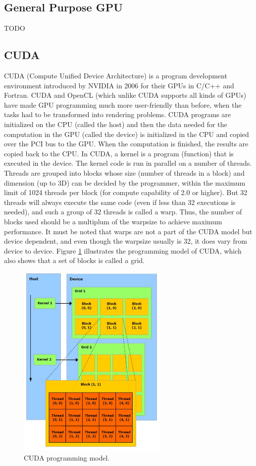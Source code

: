 \subsection{General Purpose GPU}
TODO 

\subsection{CUDA}
CUDA (Compute Uniﬁed Device Architecture) is a program development environment introduced by NVIDIA in 2006 for their GPUs in C/C++ and Fortran\cite{cudaWebpage}. CUDA and OpenCL (which unlike CUDA supports all kinds of GPUs) have made GPU programming much more user-friendly than before, when the tasks had to be transformed into rendering problems. CUDA programs are initialized on the CPU (called the host) and then the data needed for the computation in the GPU (called the device) is initialized in the CPU and copied over the PCI bus to the GPU. When the computation is finished, the results are copied back to the CPU. In CUDA, a kernel is a program (function) that is executed in the device. The kernel code is run in parallel on a number of threads. Threads are grouped into blocks whose size (number of threads in a block) and dimension (up to 3D) can be decided by the programmer, within the maximum limit of 1024 threads per block (for compute capability of 2.0 or higher). But 32 threads will always execute the same code (even if less than 32 executions is needed), and such a group of 32 threads is called a warp. Thus, the number of blocks used should be a multiplum of the warpsize to achieve maximum performance. It must be noted that warps are not a part of the CUDA model but device dependent, and even though the warpsize usually is 32, it does vary from device to device. Figure \ref{CUDAProgModel} illustrates the programming model of CUDA, which also shows that a set of blocks is called a grid.

\begin{figure}[h!]
\centering
\includegraphics[width=0.65\textwidth]{backgroundTheory/parallel/CUDAProgModel}
\caption{CUDA programming model.}
\label{CUDAProgModel}
\end{figure} 

